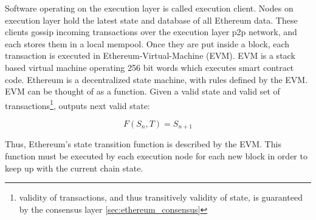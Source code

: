 Software operating on the execution layer is called execution client. Nodes on
execution layer hold the latest state and database of all Ethereum data. These
clients gossip incoming transactions over the execution layer p2p network, and
each stores them in a local mempool. Once they are put inside a block, each
transaction is executed in Ethereum-Virtual-Machine (EVM). EVM is a stack based
virtual machine operating 256 bit words which executes smart contract code.
Ethereum is a decentralized state machine, with rules defined by the EVM.
EVM can be thought of as a function. Given a valid state and valid set of
transactions\footnote{validity of transactions, and thus transitively validity
of state, is guaranteed by the consensus layer \ref{sec:ethereum_consensus}},
outputs next valid state:

\[
F(S_n, T) = S_{n+1}
\]

Thus, Ethereum's state transition function is described by the EVM. This function
must be executed by each execution node for each new block in order to keep up
with the current chain state. \cite{ethereumEthereumVirtual}


